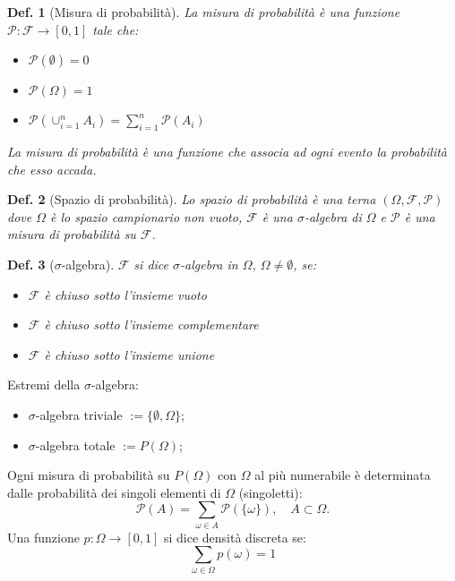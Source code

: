 \documentclass{article}
\newtheorem{definition}{Def.}[section]
\begin{document}
\begin{definition}[Misura di probabilità] La misura di probabilità è una funzione
$\mathcal{P}: \mathcal{F} \to [0, 1]$ tale che:
\begin{itemize}
	\item $\mathcal{P}(\emptyset) = 0$
	\item $\mathcal{P}(\Omega) = 1$
	\item $\mathcal{P}(\cup_{i=1}^n A_i) = \sum_{i=1}^n \mathcal{P}(A_i)$
\end{itemize}
La misura di probabilità è una funzione che associa ad ogni evento la probabilità
che esso accada.
\end{definition}

\begin{definition}[Spazio di probabilità] Lo spazio di probabilità è una terna $(\Omega,
\mathcal{F}, \mathcal{P})$ dove $\Omega$ è lo spazio campionario non vuoto, 
$\mathcal{F}$ è una $\sigma$-algebra di $\Omega$ e $\mathcal{P}$ è una misura di
probabilità su $\mathcal{F}$.
\end{definition}

\begin{definition}[$\sigma$-algebra] $\mathcal{F}$ si dice $\sigma$-algebra in $\Omega$,
$\Omega \neq \emptyset$, se:
\begin{itemize}
	\item $\mathcal{F}$ è chiuso sotto l'insieme vuoto
	\item $\mathcal{F}$ è chiuso sotto l'insieme complementare
	\item $\mathcal{F}$ è chiuso sotto l'insieme unione
\end{itemize}
\end{definition}

Estremi della $\sigma$-algebra:
\begin{itemize}
	\item $\sigma$-algebra triviale $:=\{\emptyset, \Omega\}$;
	\item $\sigma$-algebra totale $:=P(\Omega)$;
\end{itemize}

Ogni misura di probabilità su $P(\Omega)$ con $\Omega$ al più numerabile è
determinata dalle probabilità dei singoli elementi di $\Omega$ (singoletti):
\begin{equation}
	\mathcal{P}(A) = \sum_{\omega \in A} \mathcal{P}(\{\omega\}), \quad A
	\subset \Omega.
\end{equation}
Una funzione $p: \Omega \to [0, 1]$ si dice densità discreta se:
\begin{equation}
	\sum_{\omega \in \Omega} p(\omega) = 1
\end{equation}
\end{document}
